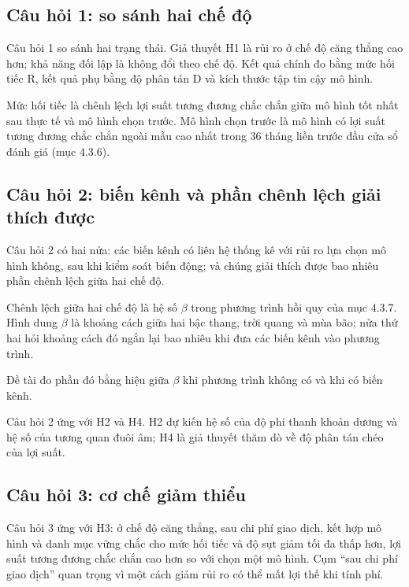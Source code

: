 \subsection{Câu hỏi 1: so sánh hai chế độ}

Câu hỏi 1 so sánh hai trạng thái. Giả thuyết H1 là rủi ro ở chế độ căng thẳng cao hơn; khả năng đối lập là không đổi theo chế độ. Kết quả chính đo bằng mức hối tiếc R, kết quả phụ bằng độ phân tán D và kích thước tập tin cậy mô hình.

Mức hối tiếc là chênh lệch lợi suất tương đương chắc chắn giữa mô hình tốt nhất sau thực tế và mô hình chọn trước. Mô hình chọn trước là mô hình có lợi suất tương đương chắc chắn ngoài mẫu cao nhất trong 36 tháng liền trước đầu cửa sổ đánh giá (mục 4.3.6).

\subsection{Câu hỏi 2: biến kênh và phần chênh lệch giải thích được}

Câu hỏi 2 có hai nửa: các biến kênh có liên hệ thống kê với rủi ro lựa chọn mô hình không, sau khi kiểm soát biến động; và chúng giải thích được bao nhiêu phần chênh lệch giữa hai chế độ.

Chênh lệch giữa hai chế độ là hệ số \texorpdfstring{$\beta$}{beta} trong phương trình hồi quy của mục 4.3.7. Hình dung \texorpdfstring{$\beta$}{beta} là khoảng cách giữa hai bậc thang, trời quang và mùa bão; nửa thứ hai hỏi khoảng cách đó ngắn lại bao nhiêu khi đưa các biến kênh vào phương trình.

Đề tài đo phần đó bằng hiệu giữa \texorpdfstring{$\beta$}{beta} khi phương trình không có và khi có biến kênh.

Câu hỏi 2 ứng với H2 và H4. H2 dự kiến hệ số của độ phi thanh khoản dương và hệ số của tương quan đuôi âm; H4 là giả thuyết thăm dò về độ phân tán chéo của lợi suất.

\subsection{Câu hỏi 3: cơ chế giảm thiểu}

Câu hỏi 3 ứng với H3: ở chế độ căng thẳng, sau chi phí giao dịch, kết hợp mô hình và danh mục vững chắc cho mức hối tiếc và độ sụt giảm tối đa thấp hơn, lợi suất tương đương chắc chắn cao hơn so với chọn một mô hình. Cụm “sau chi phí giao dịch” quan trọng vì một cách giảm rủi ro có thể mất lợi thế khi tính phí.

